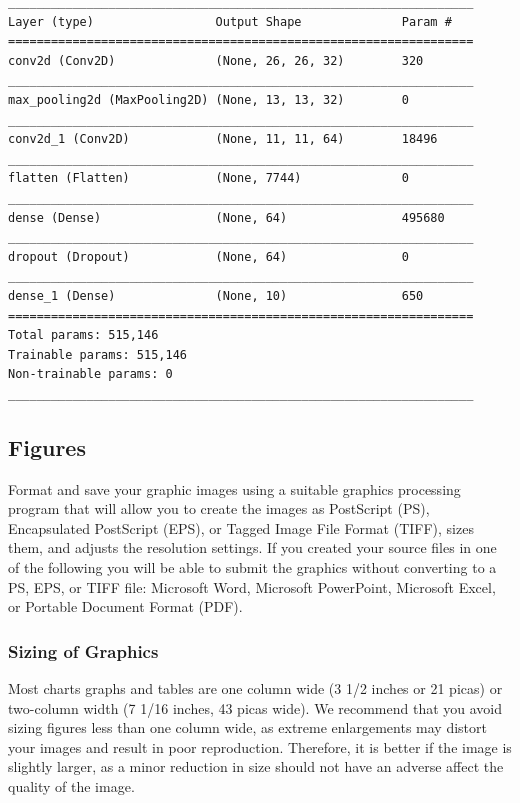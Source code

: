 \documentclass[transmag, onecolumn]{IEEEtran}
\begin{document}
\begin{verbatim}
_________________________________________________________________
Layer (type)                 Output Shape              Param #
=================================================================
conv2d (Conv2D)              (None, 26, 26, 32)        320
_________________________________________________________________
max_pooling2d (MaxPooling2D) (None, 13, 13, 32)        0
_________________________________________________________________
conv2d_1 (Conv2D)            (None, 11, 11, 64)        18496
_________________________________________________________________
flatten (Flatten)            (None, 7744)              0
_________________________________________________________________
dense (Dense)                (None, 64)                495680
_________________________________________________________________
dropout (Dropout)            (None, 64)                0
_________________________________________________________________
dense_1 (Dense)              (None, 10)                650
=================================================================
Total params: 515,146
Trainable params: 515,146
Non-trainable params: 0
_________________________________________________________________
\end{verbatim}

\subsection{Figures}
Format and save your graphic images using a suitable graphics processing 
program that will allow you to create the images as PostScript (PS), 
Encapsulated PostScript (EPS), or Tagged Image File Format (TIFF), sizes 
them, and adjusts the resolution settings. If you created your source files 
in one of the following you will be able to submit the graphics without 
converting to a PS, EPS, or TIFF file: Microsoft Word, Microsoft PowerPoint, 
Microsoft Excel, or Portable Document Format (PDF). 

\subsubsection*{Sizing of Graphics}

Most charts graphs and tables are one column wide (3 1/2 inches or 21 picas) 
or two-column width (7 1/16 inches, 43 picas wide). We recommend that you 
avoid sizing figures less than one column wide, as extreme enlargements may 
distort your images and result in poor reproduction. Therefore, it is better 
if the image is slightly larger, as a minor reduction in size should not 
have an adverse affect the quality of the image. 
\end{document}
